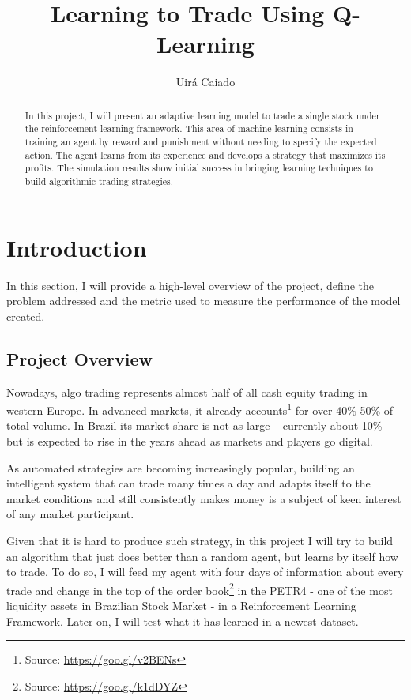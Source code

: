 \documentclass[a4paper]{article}
\title{Learning to Trade Using Q-Learning}
\author{Uirá Caiado}
\begin{document}
\maketitle

\begin{abstract}
In this project, I will present an adaptive learning model to trade a single stock under the reinforcement learning framework. This area of machine learning consists in training an agent by reward and punishment without needing to specify the expected action. The agent learns from its experience and develops a strategy that maximizes its profits. The simulation results show initial success in bringing learning techniques to build algorithmic trading strategies.
\end{abstract}


\section{Introduction}
\label{sec:introduction}

In this section, I will provide a high-level overview of the project, define the problem addressed and the metric used to measure the performance of the model created.

\subsection{Project Overview}
Nowadays, algo trading represents almost half of all cash equity trading in western Europe. In advanced markets, it already accounts\footnote{Source: \url{https://goo.gl/v2BENs}} for over 40\%-50\% of total volume. In Brazil its market share is not as large – currently about 10\% – but is expected to rise in the years ahead as markets and players go digital.

As automated strategies are becoming increasingly popular, building an intelligent system that can trade many times a day and adapts itself to the market conditions and still consistently makes money is a subject of keen interest of any market participant.

Given that it is hard to produce such strategy, in this project I will try to build an algorithm that just does better than a random agent, but learns by itself how to trade. To do so, I will feed my agent with four days of information about every trade and change in the top of the order book\footnote{Source: \url{https://goo.gl/k1dDYZ}} in the PETR4 - one of the most liquidity assets in Brazilian Stock Market - in a Reinforcement Learning Framework. Later on, I will test what it has learned in a newest dataset.
\end{document}
